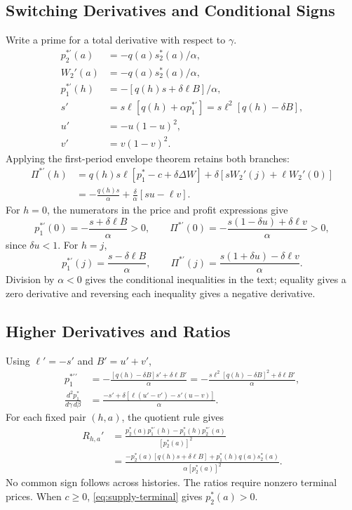 \documentclass[12pt]{article}
\theoremstyle{definition}
\theoremstyle{remark}
\begin{document}
\subsection{Switching Derivatives and Conditional Signs}
Write a prime for a total derivative with respect to $\gamma$.
\begin{align}
 p_2^{*\prime}(a)&=-q(a)s_2^*(a)/\alpha,\\
 W_2'(a)&=-q(a)s_2^*(a)/\alpha,\\
 p_1^{*\prime}(h)&=-[q(h)s+\delta\ell B]/\alpha,\\
 s'&=s\ell[q(h)+\alpha p_1^{*\prime}]
 =s\ell^2[q(h)-\delta B],\\
 u'&=-u(1-u)^2,\\
 v'&=v(1-v)^2.
\end{align}
Applying the first-period envelope theorem retains both branches:
\begin{align}
 \Pi^{*\prime}(h)
 &=q(h)s\ell[p_1^*-c+\delta\Delta W]
 +\delta[sW_2'(j)+\ell W_2'(0)]\\
 &=-\frac{q(h)s}{\alpha}
 +\frac{\delta}{\alpha}[su-\ell v].
\end{align}
For $h=0$, the numerators in the price and profit expressions give
\begin{equation}
 p_1^{*\prime}(0)=-\frac{s+\delta\ell B}{\alpha}>0,\qquad
 \Pi^{*\prime}(0)=-\frac{s(1-\delta u)+\delta\ell v}{\alpha}>0,
\end{equation}
since $\delta u<1$. For $h=j$,
\begin{equation}
 p_1^{*\prime}(j)=\frac{s-\delta\ell B}{\alpha},\qquad
 \Pi^{*\prime}(j)=\frac{s(1+\delta u)-\delta\ell v}{\alpha}.
\end{equation}
Division by $\alpha<0$ gives the conditional inequalities in the text;
equality gives a zero derivative and reversing each inequality gives a negative derivative.

\subsection{Higher Derivatives and Ratios}
Using $\ell'=-s'$ and $B'=u'+v'$,
\begin{align}
 p_1^{*\prime\prime}
 &=-\frac{[q(h)-\delta B]s'+\delta\ell B'}{\alpha}
 =-\frac{s\ell^2[q(h)-\delta B]^2+\delta\ell B'}{\alpha},\\
 \frac{d^2p_1^*}{d\gamma\,d\beta}
 &=\frac{-s'+\delta[\ell(u'-v')-s'(u-v)]}{\alpha}.
\end{align}
For each fixed pair $(h,a)$, the quotient rule gives
\begin{align}
 R_{h,a}'&=\frac{p_2^*(a)p_1^{*\prime}(h)-p_1^*(h)p_2^{*\prime}(a)}{[p_2^*(a)]^2}\\
 &=\frac{-p_2^*(a)[q(h)s+\delta\ell B]
 +p_1^*(h)q(a)s_2^*(a)}{\alpha[p_2^*(a)]^2}.
\end{align}
No common sign follows across histories. The ratios require nonzero terminal
prices. When $c\ge0$, \eqref{eq:supply-terminal} gives $p_2^*(a)>0$.
\end{document}
